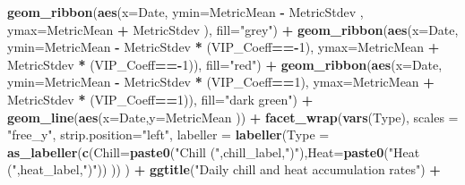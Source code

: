 \documentclass[
]{book}
\newenvironment{Shaded}{\begin{snugshade}}{\end{snugshade}}
\newcommand{\DataTypeTok}[1]{\textcolor[rgb]{0.13,0.29,0.53}{#1}}
\newcommand{\DecValTok}[1]{\textcolor[rgb]{0.00,0.00,0.81}{#1}}
\newcommand{\KeywordTok}[1]{\textcolor[rgb]{0.13,0.29,0.53}{\textbf{#1}}}
\newcommand{\NormalTok}[1]{#1}
\newcommand{\OperatorTok}[1]{\textcolor[rgb]{0.81,0.36,0.00}{\textbf{#1}}}
\newcommand{\StringTok}[1]{\textcolor[rgb]{0.31,0.60,0.02}{#1}}
\begin{document}
\begin{Shaded}
\begin{Highlighting}[]
\StringTok{    }\KeywordTok{geom_ribbon}\NormalTok{(}\KeywordTok{aes}\NormalTok{(}\DataTypeTok{x=}\NormalTok{Date,}
                    \DataTypeTok{ymin=}\NormalTok{MetricMean }\OperatorTok{-}\StringTok{ }\NormalTok{MetricStdev ,}
                    \DataTypeTok{ymax=}\NormalTok{MetricMean }\OperatorTok{+}\StringTok{ }\NormalTok{MetricStdev ),}
                \DataTypeTok{fill=}\StringTok{"grey"}\NormalTok{) }\OperatorTok{+}
\StringTok{    }\KeywordTok{geom_ribbon}\NormalTok{(}\KeywordTok{aes}\NormalTok{(}\DataTypeTok{x=}\NormalTok{Date,}
                    \DataTypeTok{ymin=}\NormalTok{MetricMean }\OperatorTok{-}\StringTok{ }\NormalTok{MetricStdev }\OperatorTok{*}\StringTok{ }\NormalTok{(VIP_Coeff}\OperatorTok{==-}\DecValTok{1}\NormalTok{),}
                    \DataTypeTok{ymax=}\NormalTok{MetricMean }\OperatorTok{+}\StringTok{ }\NormalTok{MetricStdev }\OperatorTok{*}\StringTok{ }\NormalTok{(VIP_Coeff}\OperatorTok{==-}\DecValTok{1}\NormalTok{)),}
                \DataTypeTok{fill=}\StringTok{"red"}\NormalTok{) }\OperatorTok{+}
\StringTok{    }\KeywordTok{geom_ribbon}\NormalTok{(}\KeywordTok{aes}\NormalTok{(}\DataTypeTok{x=}\NormalTok{Date,}
                    \DataTypeTok{ymin=}\NormalTok{MetricMean }\OperatorTok{-}\StringTok{ }\NormalTok{MetricStdev }\OperatorTok{*}\StringTok{ }\NormalTok{(VIP_Coeff}\OperatorTok{==}\DecValTok{1}\NormalTok{),}
                    \DataTypeTok{ymax=}\NormalTok{MetricMean }\OperatorTok{+}\StringTok{ }\NormalTok{MetricStdev }\OperatorTok{*}\StringTok{ }\NormalTok{(VIP_Coeff}\OperatorTok{==}\DecValTok{1}\NormalTok{)),}
                \DataTypeTok{fill=}\StringTok{"dark green"}\NormalTok{) }\OperatorTok{+}
\StringTok{    }\KeywordTok{geom_line}\NormalTok{(}\KeywordTok{aes}\NormalTok{(}\DataTypeTok{x=}\NormalTok{Date,}\DataTypeTok{y=}\NormalTok{MetricMean )) }\OperatorTok{+}
\StringTok{    }\KeywordTok{facet_wrap}\NormalTok{(}\KeywordTok{vars}\NormalTok{(Type), }\DataTypeTok{scales =} \StringTok{"free_y"}\NormalTok{,}
               \DataTypeTok{strip.position=}\StringTok{"left"}\NormalTok{,}
               \DataTypeTok{labeller =} \KeywordTok{labeller}\NormalTok{(}\DataTypeTok{Type =} \KeywordTok{as_labeller}\NormalTok{(}\KeywordTok{c}\NormalTok{(}\DataTypeTok{Chill=}\KeywordTok{paste0}\NormalTok{(}\StringTok{"Chill ("}\NormalTok{,chill_label,}\StringTok{")"}\NormalTok{),}\DataTypeTok{Heat=}\KeywordTok{paste0}\NormalTok{(}\StringTok{"Heat ("}\NormalTok{,heat_label,}\StringTok{")"}\NormalTok{)) )) ) }\OperatorTok{+}
\StringTok{    }\KeywordTok{ggtitle}\NormalTok{(}\StringTok{"Daily chill and heat accumulation rates"}\NormalTok{) }\OperatorTok{+}

\end{Highlighting}
\end{Shaded}
\end{document}
